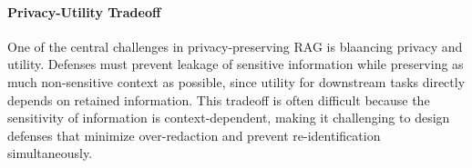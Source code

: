 \paragraph{Privacy-Utility Tradeoff}
One of the central challenges in privacy-preserving \ac{RAG} is blaancing privacy and utility. Defenses must prevent leakage of sensitive information while preserving as much non-sensitive context as possible, since utility for downstream tasks directly depends on retained information. This tradeoff is often difficult because the sensitivity of information is context-dependent, making it challenging to design defenses that minimize over-redaction and prevent re-identification simultaneously.
